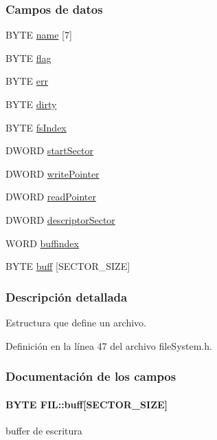 \subsubsection*{Campos de datos}
\begin{DoxyCompactItemize}
\item 
B\+Y\+T\+E \hyperlink{structFIL_a21240fe08417eb46f794e67519bf4a58}{name} \mbox{[}7\mbox{]}
\item 
B\+Y\+T\+E \hyperlink{structFIL_ac409508881f5a16f2998ae675072b376}{flag}
\item 
B\+Y\+T\+E \hyperlink{structFIL_aea440945db26de9c4a88065c0c887fda}{err}
\item 
B\+Y\+T\+E \hyperlink{structFIL_a32847fe875861954ec3dc750d332a194}{dirty}
\item 
B\+Y\+T\+E \hyperlink{structFIL_ab32bf8d0b478b2cef4942b2128f4f5f5}{fs\+Index}
\item 
D\+W\+O\+R\+D \hyperlink{structFIL_a684d4d555f293b08b8396c35e20706d3}{start\+Sector}
\item 
D\+W\+O\+R\+D \hyperlink{structFIL_a89e92b4845c72b4f9f119b38d1142a41}{write\+Pointer}
\item 
D\+W\+O\+R\+D \hyperlink{structFIL_ad0d1f48655e0e06936cb7883993afb1f}{read\+Pointer}
\item 
D\+W\+O\+R\+D \hyperlink{structFIL_a043930088c6fdc5e523500b833106476}{descriptor\+Sector}
\item 
W\+O\+R\+D \hyperlink{structFIL_a5fb6271e3cc261b9f811bb8860cb6110}{buffindex}
\item 
B\+Y\+T\+E \hyperlink{structFIL_a9e1f6c5e0e2cd4fd3705e5a213ad2f83}{buff} \mbox{[}S\+E\+C\+T\+O\+R\+\_\+\+S\+I\+Z\+E\mbox{]}
\end{DoxyCompactItemize}


\subsubsection{Descripción detallada}
Estructura que define un archivo. 

Definición en la línea 47 del archivo file\+System.\+h.



\subsubsection{Documentación de los campos}
\hypertarget{structFIL_a9e1f6c5e0e2cd4fd3705e5a213ad2f83}{
\paragraph[{buff}]{\setlength{\rightskip}{0pt plus 5cm}B\+Y\+T\+E F\+I\+L\+::buff\mbox{[}S\+E\+C\+T\+O\+R\+\_\+\+S\+I\+Z\+E\mbox{]}}}\label{structFIL_a9e1f6c5e0e2cd4fd3705e5a213ad2f83}
buffer de escritura 

